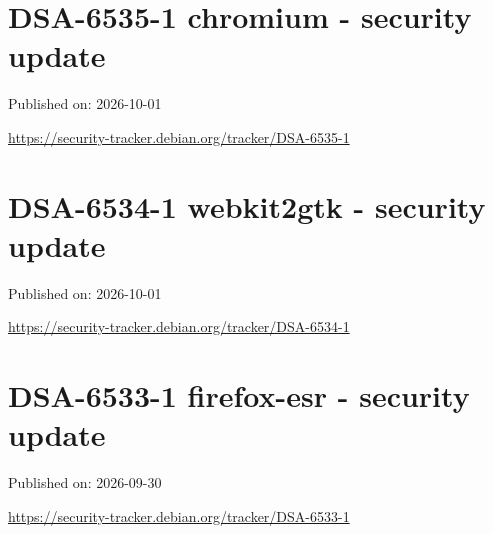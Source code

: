\documentclass[11pt,a4paper]{article}
\begin{document}
\section{DSA-6535-1 chromium - security update}

Published on: 2026-10-01

\href{https://security-tracker.debian.org/tracker/DSA-6535-1}{https://security-tracker.debian.org/tracker/DSA-6535-1}

\section{DSA-6534-1 webkit2gtk - security update}

Published on: 2026-10-01

\href{https://security-tracker.debian.org/tracker/DSA-6534-1}{https://security-tracker.debian.org/tracker/DSA-6534-1}

\section{DSA-6533-1 firefox-esr - security update}

Published on: 2026-09-30

\href{https://security-tracker.debian.org/tracker/DSA-6533-1}{https://security-tracker.debian.org/tracker/DSA-6533-1}
\end{document}
